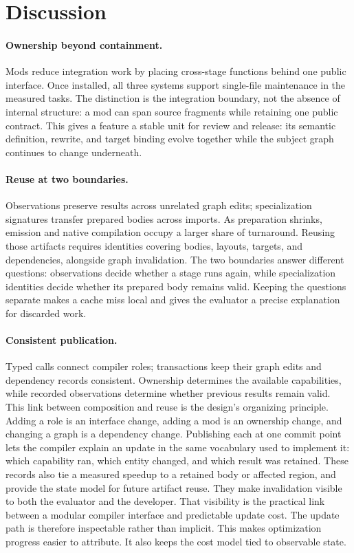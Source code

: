\section{Discussion}
\label{sec:discussion}

\paragraph{Ownership beyond containment.} Mods reduce integration work by
placing cross-stage functions behind one public interface. Once installed,
all three systems support single-file maintenance in the measured tasks.
The distinction is the integration boundary, not the absence of internal
structure: a mod can span source fragments while retaining one public contract.
This gives a feature a stable unit for review and release: its semantic
definition, rewrite, and target binding evolve together while the subject graph
continues to change underneath.

\paragraph{Reuse at two boundaries.} Observations preserve results across
unrelated graph edits; specialization signatures transfer prepared bodies
across imports. As preparation shrinks, emission and native compilation occupy
a larger share of turnaround. Reusing those artifacts requires identities
covering bodies, layouts, targets, and dependencies, alongside graph invalidation.
The two boundaries answer different questions: observations decide whether a
stage runs again, while specialization identities decide whether its prepared
body remains valid. Keeping the questions separate makes a cache miss local and
gives the evaluator a precise explanation for discarded work.

\paragraph{Consistent publication.} Typed calls connect compiler roles;
transactions keep their graph edits and dependency records consistent.
Ownership determines the available capabilities, while recorded observations
determine whether previous results remain valid. This link between composition
and reuse is the design's organizing principle. Adding a role is an interface
change, adding a mod is an ownership change, and changing a graph is a
dependency change. Publishing each at one commit point lets the compiler
explain an update in the same vocabulary used to implement it: which capability
ran, which entity changed, and which result was retained.
These records also tie a measured speedup to a retained body or affected region,
and provide the state model for future artifact reuse.
They make invalidation visible to both the evaluator and the developer.
That visibility is the practical link between a modular compiler interface and
predictable update cost. The update path is therefore inspectable rather than
implicit. This makes optimization progress easier to attribute. It also keeps
the cost model tied to observable state.
